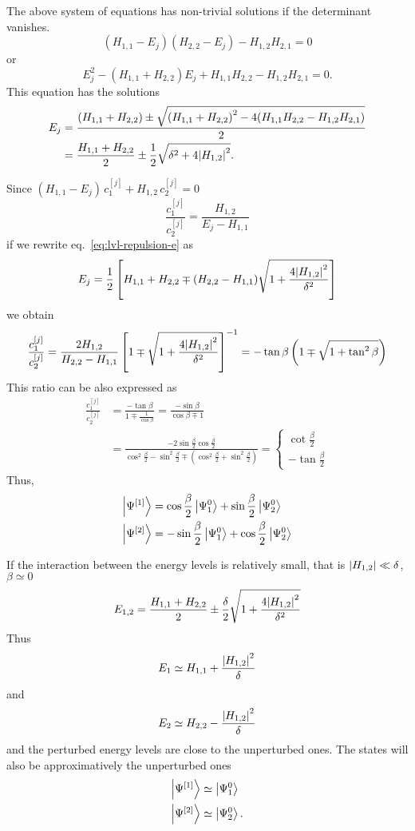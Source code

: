 \documentclass[../thesis.tex]{subfiles}
\theoremstyle{definition}
\begin{document}
The above system of equations has non-trivial solutions if the determinant vanishes.
\[
  (H_{1,1} - E_j)(H_{2,2} - E_j) - H_{1,2} H_{2,1} = 0
\]
or
\[
  E_j^2 - (H_{1,1} + H_{2,2}) E_j + H_{1,1} H_{2,2} - H_{1,2} H_{2,1} = 0.
\]
This equation has the solutions
\begin{align}
  E_j &= \frac{(H_{1,1} + H_{2,2}) \pm
         \sqrt{ {(H_{1,1} + H_{2,2})}^2 - 4(H_{1,1} H_{2,2} - H_{1,2} H_{2,1})}}{2} \\
      &= \frac{H_{1,1} + H_{2,2}}{2} \pm \frac{1}{2} \sqrt{\delta^2 + 4 \abs{H_{1,2}}^2}.
\label{eq:lvl-repulsion-e}
\end{align}

Since \((H_{1,1} - E_j)\, c_1^{[j]} + H_{1,2}\, c_2^{[j]} = 0\)
\[
  \frac{c_1^{[j]}}{c_2^{[j]}} = \frac{H_{1,2}}{E_j - H_{1,1}}
\]
if we rewrite eq.~\eqref{eq:lvl-repulsion-e} as
\[
  E_j = \frac{1}{2} \left[ H_{1,1} + H_{2,2} \mp (H_{2,2} - H_{1,1})
        \sqrt{1 + \frac{4\abs{H_{1,2}}^2}{\delta^2}}\right]
\]
we obtain
\[
  \frac{c_1^{[j]}}{c_2^{[j]}} = \frac{2 H_{1,2}}{H_{2,2} - H_{1,1}}
  \left[ 1 \mp \sqrt{1 + \frac{4\abs{H_{1,2}}^2}{\delta^2}} \right]^{-1}
  = -\tan{\beta}\left(1 \mp \sqrt{1+\tan^2\beta}\right)
\]
This ratio can be also expressed as
\begin{align*}
  \frac{c_1^{[j]}}{c_2^{[j]}} &= \frac{-\tan{\beta}}{1 \mp \frac{1}{\cos{\beta}}}
  = \frac{-\sin{\beta}}{\cos{\beta} \mp 1} \\
  &= \frac{-2\sin{\frac{\beta}{2}} \cos{\frac{\beta}{2}}}
      {\cos^2{\frac{\beta}{2}} - \sin^2{\frac{\beta}{2}} \mp
        \left(\cos^2{\frac{\beta}{2}} + \sin^2{\frac{\beta}{2}}\right)}
  =
  \begin{cases}
    \cot{\frac{\beta}{2}} \\
    -\tan{\frac{\beta}{2}}
  \end{cases}
\end{align*}
Thus,
\begin{align*}
  \ket{\Psi^{[1]}} &= \cos{\frac{\beta}{2}} \ket{\Psi_1^0} + \sin{\frac{\beta}{2}} \ket{\Psi_2^0} \\
  \ket{\Psi^{[2]}} &= -\sin{\frac{\beta}{2}} \ket{\Psi_1^0} + \cos{\frac{\beta}{2}} \ket{\Psi_2^0}
\end{align*}

If the {\color{red}interaction} between the energy levels is relatively small,
that is \(\abs{H_{1,2}} \ll \delta \), \(\beta \simeq 0\)
\[
  E_{1,2} = \frac{H_{1,1} + H_{2,2}}{2} \pm
            \frac{\delta}{2} \sqrt{1 + \frac{4 \abs{H_{1,2}}^2}{\delta^2}}
\]
Thus
\[
  E_1 \simeq H_{1,1} + \frac{\abs{H_{1,2}}^2}{\delta}
\]
and
\[
  E_2 \simeq H_{2,2} - \frac{\abs{H_{1,2}}^2}{\delta}
\]
and the perturbed energy levels are close to the unperturbed ones.
The states will also be approximatively the unperturbed ones
\begin{align*}
  \ket{\Psi^{[1]}} &\simeq \ket{\Psi_1^0} \\
  \ket{\Psi^{[2]}} &\simeq \ket{\Psi_2^0}.
\end{align*}
\end{document}
